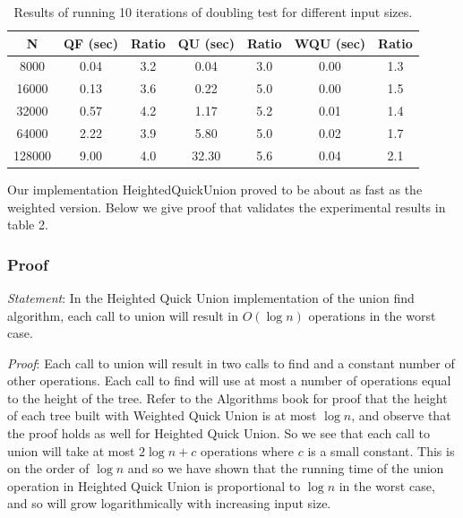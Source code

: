 \documentclass{article}
\begin{document}
\begin{table}[H]
	\begin{center}
		\begin{tabular}{c | c c c c c c } %
			\toprule
			{\bf N} & {\bf QF (sec)} & {\bf Ratio } & {\bf  QU (sec)} & {\bf Ratio } & {\bf WQU  (sec)} & {\bf Ratio }  \\ 
			\midrule
			8000 & 0.04 & 3.2 & 0.04 & 3.0 & 0.00 & 1.3 \\
			16000 & 0.13 & 3.6 & 0.22 & 5.0 & 0.00 & 1.5 \\
			32000 & 0.57 & 4.2 & 1.17 & 5.2 & 0.01 & 1.4 \\
			64000 & 2.22 & 3.9 & 5.80 & 5.0 & 0.02 & 1.7 \\
			128000 & 9.00 & 4.0 & 32.30 & 5.6 & 0.04 & 2.1 \\			
			\bottomrule
		\end{tabular}
		\caption{Results of running 10 iterations of doubling test for different input sizes.}
		\label{tab:deami2}
	\end{center}
\end{table}

Our implementation HeightedQuickUnion proved to be about as fast as the weighted version. Below we give proof that validates the experimental results in table 2.

\subsubsection*{Proof}
\emph{Statement}: In the Heighted Quick Union implementation of the union find algorithm, each call to union will result in $O(\log n)$ operations in the worst case.

\emph{Proof}: Each call to union will result in two calls to find and a constant number of other operations. Each call to find will use at most a number of operations equal to the height of the tree. Refer to the Algorithms book \cite{Sedgewick:2012} for proof that the height of each tree built with Weighted Quick Union is at most $\log n$, and observe that the proof holds as well for Heighted Quick Union. So we see that each call to union will take at most $2 \log n + c$ operations where $c$ is a small constant. This is on the order of $\log n$ and so we have shown that the running time of the union operation in Heighted Quick Union is proportional to $\log n$ in the worst case, and so will grow logarithmically with increasing input size.\\
\end{document}
